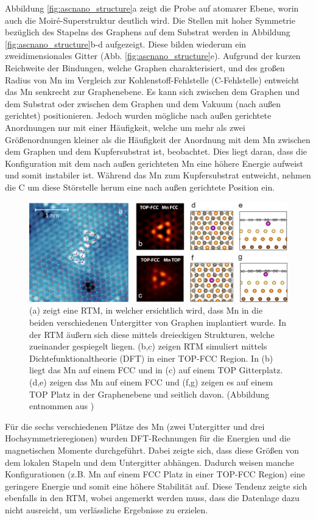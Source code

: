 Abbildung \ref{fig:ascnano_structure}a zeigt die Probe auf atomarer Ebene, worin auch die Moiré-Superstruktur deutlich wird.
Die Stellen mit hoher Symmetrie bezüglich des Stapelns des Graphens auf dem Substrat werden in 
Abbildung \ref{fig:ascnano_structure}b-d aufgezeigt.
Diese bilden wiederum ein zweidimensionales Gitter (Abb. \ref{fig:ascnano_structure}e).
Aufgrund der kurzen Reichweite der Bindungen, welche Graphen charakterisiert, und des großen Radius von Mn im Vergleich zur 
Kohlenstoff-Fehlstelle (C-Fehlstelle) entweicht das Mn senkrecht zur Graphenebene.
Es kann sich zwischen dem Graphen und dem Substrat oder zwischen dem Graphen und dem Vakuum (nach außen gerichtet) positionieren. 
Jedoch wurden mögliche nach außen gerichtete Anordnungen nur mit einer Häufigkeit, 
welche um mehr als zwei Größenordnungen kleiner als die Häufigkeit der Anordnung mit dem Mn 
zwischen dem Graphen und dem Kupfersubstrat ist, beobachtet.
Dies liegt daran, dass die Konfiguration mit dem nach außen gerichteten Mn eine höhere Energie aufweist und somit instabiler ist.
Während das Mn zum Kupfersubstrat entweicht, nehmen die C um diese Störstelle herum eine nach außen gerichtete Position ein.
\begin{figure}
    \centering
    \includegraphics[width = 0.95 \textwidth]{Plots/images_large_nn1c00139_0003.jpeg}
    \caption{(a) zeigt eine RTM, in welcher ersichtlich wird, dass Mn in die beiden verschiedenen Untergitter von Graphen implantiert wurde. In der
    RTM äußern sich diese mittels dreieckigen Strukturen, welche zueinander gespiegelt liegen.
    (b,c) zeigen RTM simuliert mittels Dichtefunktionaltheorie (DFT) in einer TOP-FCC Region. In (b) liegt das Mn auf einem FCC
    und in (c) auf einem TOP Gitterplatz. (d,e) zeigen das Mn auf einem FCC und (f,g) zeigen es auf einem TOP Platz in der Graphenebene und seitlich davon.
    (Abbildung entnommen  aus \cite{doi:10.1021/acsnano.1c00139})}
    \label{fig:ascnano_defect}
\end{figure}
Für die sechs verschiedenen Plätze des Mn (zwei Untergitter und drei Hochsymmetrieregionen) wurden DFT-Rechnungen für die Energien und die magnetischen Momente durchgeführt.
Dabei zeigte sich, dass diese Größen von dem lokalen Stapeln und dem Untergitter abhängen.
Dadurch weisen manche Konfigurationen (z.B. Mn auf einem FCC Platz in einer TOP-FCC Region) eine geringere Energie und somit eine höhere Stabilität auf.
Diese Tendenz zeigte sich ebenfalls in den RTM, wobei angemerkt werden muss, dass die Datenlage dazu nicht ausreicht, um
verlässliche Ergebnisse zu erzielen.  
\newpage
\FloatBarrier
